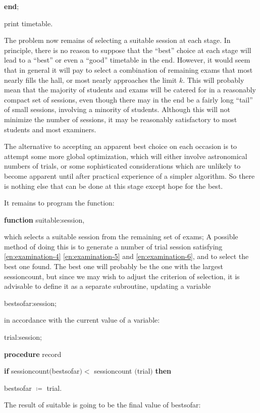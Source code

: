 \quad \quad \textbf{end};

\quad print timetable.

The problem now remains of selecting a suitable session at each stage. In principle, there is no reason to suppose that the ``best'' choice at each stage will lead to a ``best'' or even a ``good'' timetable in the end. However, it would seem that in general it will pay to select a combination of remaining exams that most nearly fills the hall, or most nearly approaches the limit $k$. This will probably mean that the majority of students and exams will be catered for in a reasonably compact set of sessions, even though there may in the end be a fairly long ``tail'' of small sessions, involving a minority of students. Although this will not minimize the number of sessions, it may be reasonably satisfactory to most students and most examiners.

The alternative to accepting an apparent best choice on each occasion is to attempt some more global optimization, which will either involve astronomical numbers of trials, or some sophisticated considerations which are unlikely to become apparent until after practical experience of a simpler algorithm. So there is nothing else that can be done at this stage except hope for the best.

It remains to program the function:

\quad \textbf{function} suitable:session,

\noindent
which selects a suitable session from the remaining set of exams; A possible method of doing this is to generate a number of trial session satisfying \ref{en:examination-4} \ref{en:examination-5} and \ref{en:examination-6}, and to select the best one found. The best one will probably be the one with the largest sessioncount, but since we may wish to adjust the criterion of selection, it is advisable to define it as a separate subroutine, updating a variable

\quad bestsofar:session;

\noindent
in accordance with the current value of a variable:

\quad trial:session;

\quad \textbf{procedure} record

\quad \quad \textbf{if} sessioncount$($bestsofar$) <$ sessioncount $($trial$)$ \textbf{then}

\quad \quad \quad bestsofar $\coloneq$ trial.

\noindent
The result of suitable is going to be the final value of bestsofar:

